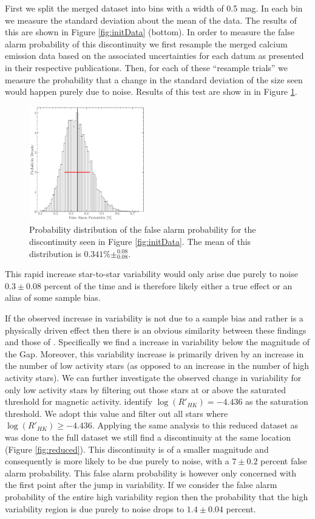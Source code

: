First we split the merged dataset into bins with a width of 0.5 mag. In each bin we
measure the standard deviation about the mean of the data. The results of this
are shown in Figure \ref{fig:initData} (bottom). In order to measure the false alarm
probability of this discontinuity we first resample the merged calcium
emission data based on the associated uncertainties for each datum as
presented in their respective publications. Then, for each of these ``resample
trials'' we measure the probability that a change in the standard deviation of
the size seen would happen purely due to noise. Results of this test are show in
in Figure \ref{fig:dist}. 

\begin{figure}
  \centering
  \includegraphics[width=0.45\textwidth]{figures/fpDist.pdf}
  \caption{Probability distribution of the false alarm probability for the
  discontinuity seen in Figure \ref{fig:initData}. The mean of this
  distribution is $0.341\%\pm^{0.08}_{0.08}$.}
  \label{fig:dist}
\end{figure}

This rapid increase star-to-star variability would only arise due purely to
noise $0.3\pm0.08$ percent of the time and is therefore likely either a true
effect or an alias of some sample bias.

If the observed increase in variability is not due to a sample bias and rather
is a physically driven effect then there is an obvious similarity between these
findings and those of \citet{Jao2023}. Specifically we find a increase in
variability below the magnitude of the Gap. Moreover, this variability
increase is primarily driven by an increase in the number of low activity stars
(as opposed to an increase in the number of high activity stars). We can
further investigate the observed change in variability for only low activity
stars by filtering out those stars at or above the saturated threshold for
magnetic activity. \citet{Boudreaux2022} identify $\log(R'_{HK}) = -4.436$ as
the saturation threshold. We adopt this value and filter out all stars where
$\log(R'_{HK}) \geq -4.436$. Applying the same analysis to this reduced dataset
as was done to the full dataset we still find a discontinuity at the same
location (Figure \ref{fig:reduced}). This discontinuity is of a smaller
magnitude and consequently is more likely to be due purely to noise, with a
$7\pm0.2$ percent false alarm probability. This false alarm probability is
however only concerned with the first point after the jump in variability. If
we consider the false alarm probability of the entire high variability region
then the probability that the high variability region is due purely to noise
drops to $1.4\pm0.04$ percent.

